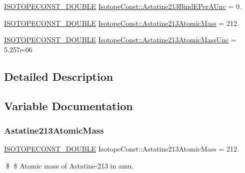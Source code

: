\begin{DoxyCompactItemize}
\mbox{\hyperlink{group___isotope_const-_macros_ga8f45a7272ce02c0b4c65c44636ed719a}{I\+S\+O\+T\+O\+P\+E\+C\+O\+N\+S\+T\+\_\+\+D\+O\+U\+B\+LE}} \mbox{\hyperlink{group___isotope_const-_astatine-_at213_gadaec15629a6b3064b1c72adde48356cb}{Isotope\+Const\+::\+Astatine213\+Bind\+E\+Per\+A\+Unc}} = 0.
\item 
\mbox{\hyperlink{group___isotope_const-_macros_ga8f45a7272ce02c0b4c65c44636ed719a}{I\+S\+O\+T\+O\+P\+E\+C\+O\+N\+S\+T\+\_\+\+D\+O\+U\+B\+LE}} \mbox{\hyperlink{group___isotope_const-_astatine-_at213_ga3749ba45c4ec1319fdf40a05b9f4d984}{Isotope\+Const\+::\+Astatine213\+Atomic\+Mass}} = 212.
\item 
\mbox{\hyperlink{group___isotope_const-_macros_ga8f45a7272ce02c0b4c65c44636ed719a}{I\+S\+O\+T\+O\+P\+E\+C\+O\+N\+S\+T\+\_\+\+D\+O\+U\+B\+LE}} \mbox{\hyperlink{group___isotope_const-_astatine-_at213_ga464aefc117615b19bb4fd9503dab1f92}{Isotope\+Const\+::\+Astatine213\+Atomic\+Mass\+Unc}} = 5.\+257e-\/06
\end{DoxyCompactItemize}


\subsection{Detailed Description}


\subsection{Variable Documentation}
\mbox{\label{group___isotope_const-_astatine-_at213_ga3749ba45c4ec1319fdf40a05b9f4d984}} 
\subsubsection{\texorpdfstring{Astatine213\+Atomic\+Mass}{Astatine213AtomicMass}}
{\footnotesize\ttfamily \mbox{\hyperlink{group___isotope_const-_macros_ga8f45a7272ce02c0b4c65c44636ed719a}{I\+S\+O\+T\+O\+P\+E\+C\+O\+N\+S\+T\+\_\+\+D\+O\+U\+B\+LE}} Isotope\+Const\+::\+Astatine213\+Atomic\+Mass = 212.}

\$ \$ Atomic mass of Astatine-\/213 in amu. \mbox{\label{group___isotope_const-_astatine-_at213_ga464aefc117615b19bb4fd9503dab1f92}} 
